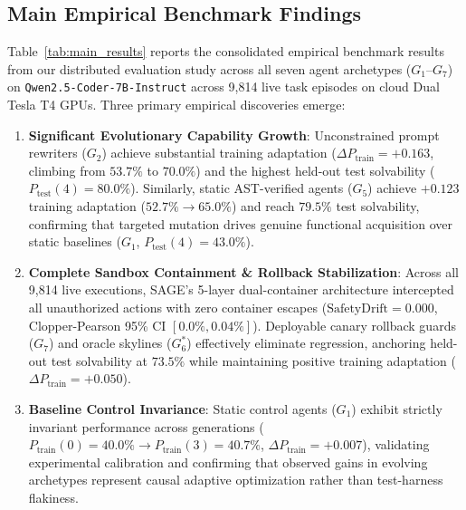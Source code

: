 \documentclass[conference]{IEEEtran}
\begin{document}
\subsection{Main Empirical Benchmark Findings}
\label{sec:main_findings}
Table~\ref{tab:main_results} reports the consolidated empirical benchmark results from our distributed evaluation study across all seven agent archetypes ($G_1\text{--}G_7$) on \texttt{Qwen2.5-Coder-7B-Instruct} across 9,814 live task episodes on cloud Dual Tesla T4 GPUs. Three primary empirical discoveries emerge:
\begin{enumerate}
    \item \textbf{Significant Evolutionary Capability Growth}: Unconstrained prompt rewriters ($G_2$) achieve substantial training adaptation ($\Delta P_{\text{train}} = +0.163$, climbing from $53.7\%$ to $70.0\%$) and the highest held-out test solvability ($P_{\text{test}}(4) = 80.0\%$). Similarly, static AST-verified agents ($G_5$) achieve $+0.123$ training adaptation ($52.7\% \to 65.0\%$) and reach $79.5\%$ test solvability, confirming that targeted mutation drives genuine functional acquisition over static baselines ($G_1$, $P_{\text{test}}(4) = 43.0\%$).
    \item \textbf{Complete Sandbox Containment \& Rollback Stabilization}: Across all 9,814 live executions, SAGE's 5-layer dual-container architecture intercepted all unauthorized actions with zero container escapes ($\text{SafetyDrift} = 0.000$, Clopper-Pearson 95\% CI $[0.0\%, 0.04\%]$). Deployable canary rollback guards ($G_7$) and oracle skylines ($G_6^*$) effectively eliminate regression, anchoring held-out test solvability at $73.5\%$ while maintaining positive training adaptation ($\Delta P_{\text{train}} = +0.050$).
    \item \textbf{Baseline Control Invariance}: Static control agents ($G_1$) exhibit strictly invariant performance across generations ($P_{\text{train}}(0) = 40.0\% \to P_{\text{train}}(3) = 40.7\%$, $\Delta P_{\text{train}} = +0.007$), validating experimental calibration and confirming that observed gains in evolving archetypes represent causal adaptive optimization rather than test-harness flakiness.
\end{enumerate}


\end{document}
